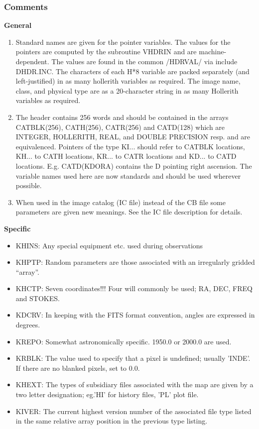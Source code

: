 \subsubsection{Comments}
{\bf General}
\begin{enumerate}
\item Standard names are given for the pointer variables.  The values
for the pointers are computed by the subroutine VHDRIN
and are machine-dependent.  The values are found in the common
/HDRVAL/ via include DHDR.INC.  The characters of each
H*8 variable are packed separately (and left-justified) in as many
hollerith variables as required.  The image name, class, and physical
type are as a 20-character string in as many Hollerith variables as
required.

\item The header contains 256 words and should be contained in the arrays
CATBLK(256), CATH(256), CATR(256) and CATD(128) which are  INTEGER,
HOLLERITH, REAL, and DOUBLE PRECISION resp. and are equivalenced.
Pointers of the type KI... should refer to CATBLK locations, KH...
to CATH locations, KR... to CATR locations and KD... to CATD
locations.  E.g.  CATD(KDORA) contains the D pointing right
ascension.  The variable names used here are now standards and
should be used wherever possible.

\item When used in the image catalog (IC file) instead of the CB file
some parameters are given new meanings.  See the IC file description
for details.
\end{enumerate}

{\bf Specific}
\begin{itemize}
\item KHINS:  Any special equipment etc. used during observations
\item KHPTP:  Random parameters are those associated with an irregularly
gridded ``array''.
\item KHCTP:  Seven coordinates!!!  Four will commonly be used; RA,
DEC, FREQ and STOKES.
\item KDCRV:  In keeping with the FITS format convention, angles are
expressed in degrees.
\item KREPO:  Somewhat astronomically specific.  1950.0 or 2000.0 are used.
\item KRBLK:  The value used to specify that a pixel is undefined;
usually 'INDE'.  If there are no blanked pixels, set to 0.0.
\item KHEXT:  The types of subsidiary files associated with the
map are given by a two letter designation; eg.'HI'
for history files, 'PL' plot file.
\item KIVER:  The current highest version number of the associated file
type listed in the same relative array position in the
previous type listing.
\end{itemize}

